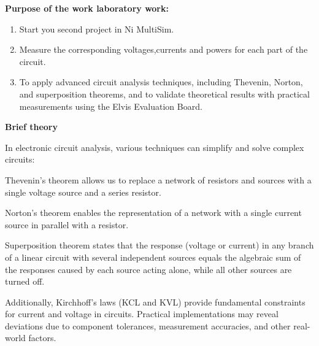 \documentclass{article}
\begin{document}
\begin{flushleft}
\textbf{Purpose of the work laboratory work:}
\end{flushleft}
\begin{enumerate}
    \item Start you second project in Ni MultiSim.
    \item Measure the corresponding voltages,currents and powers for each part of the circuit.
    \item To apply advanced circuit analysis techniques, including Thevenin, Norton, and superposition theorems, and to validate theoretical results with practical measurements using the Elvis Evaluation Board.
\end{enumerate}

\begin{flushleft}
\textbf{Brief theory}
\end{flushleft}

\begin{flushleft}
In electronic circuit analysis, various techniques can simplify and solve complex circuits:

Thevenin's theorem allows us to replace a network of resistors and sources with a single voltage source and a series resistor.

Norton's theorem enables the representation of a network with a single current source in parallel with a resistor.

Superposition theorem states that the response (voltage or current) in any branch of a linear circuit with several independent sources equals the algebraic sum of the responses caused by each source acting alone, while all other sources are turned off.

Additionally, Kirchhoff's laws (KCL and KVL) provide fundamental constraints for current and voltage in circuits. Practical implementations may reveal deviations due to component tolerances, measurement accuracies, and other real-world factors.
\end{flushleft}
\end{document}
